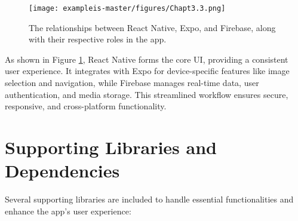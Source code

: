 \begin{figure}[h]
    \centering
    \texttt{[image: exampleis-master/figures/Chapt3.3.png]}
    \caption{The relationships between React Native, Expo, and Firebase, along with their respective roles in the app.}
    \label{fig:integration1}
\end{figure}

As shown in Figure \ref{fig:integration1}, React Native forms the core UI, providing a consistent user experience. It integrates with Expo for device-specific features like image selection and navigation, while Firebase manages real-time data, user authentication, and media storage. This streamlined workflow ensures secure, responsive, and cross-platform functionality.


\section{Supporting Libraries and Dependencies}
Several supporting libraries are included to handle essential functionalities and enhance the app’s user experience:

